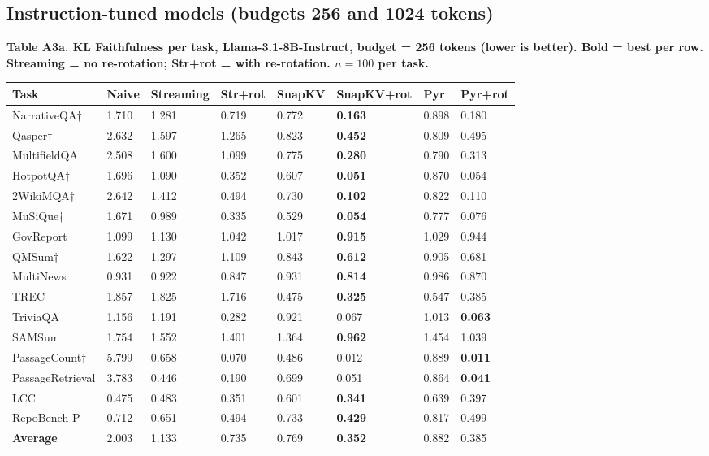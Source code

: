 \documentclass[10pt,letterpaper]{article}
\begin{document}
\subsection*{Instruction-tuned models (budgets 256 and 1024 tokens)}


\textbf{Table A3a. KL Faithfulness per task, Llama-3.1-8B-Instruct,
budget = 256 tokens (lower is better). Bold = best per row.
Streaming = no re-rotation; Str+rot = with re-rotation.
$n = 100$ per task.}

\begin{table}[H]
\centering
\small
\begin{tabular}{@{}llllllll@{}}
\toprule
Task & Naive & Streaming & Str+rot & SnapKV & SnapKV+rot & Pyr &
Pyr+rot\\
\midrule
NarrativeQA† & 1.710 & 1.281 & 0.719 & 0.772 & \textbf{0.163} & 0.898 &
0.180\\
Qasper† & 2.632 & 1.597 & 1.265 & 0.823 & \textbf{0.452} & 0.809 &
0.495\\
MultifieldQA & 2.508 & 1.600 & 1.099 & 0.775 & \textbf{0.280} & 0.790 &
0.313\\
HotpotQA† & 1.696 & 1.090 & 0.352 & 0.607 & \textbf{0.051} & 0.870 &
0.054\\
2WikiMQA† & 2.642 & 1.412 & 0.494 & 0.730 & \textbf{0.102} & 0.822 &
0.110\\
MuSiQue† & 1.671 & 0.989 & 0.335 & 0.529 & \textbf{0.054} & 0.777 &
0.076\\
GovReport & 1.099 & 1.130 & 1.042 & 1.017 & \textbf{0.915} & 1.029 &
0.944\\
QMSum† & 1.622 & 1.297 & 1.109 & 0.843 & \textbf{0.612} & 0.905 &
0.681\\
MultiNews & 0.931 & 0.922 & 0.847 & 0.931 & \textbf{0.814} & 0.986 &
0.870\\
TREC & 1.857 & 1.825 & 1.716 & 0.475 & \textbf{0.325} & 0.547 &
0.385\\
TriviaQA & 1.156 & 1.191 & 0.282 & 0.921 & 0.067 & 1.013 &
\textbf{0.063}\\
SAMSum & 1.754 & 1.552 & 1.401 & 1.364 & \textbf{0.962} & 1.454 &
1.039\\
PassageCount† & 5.799 & 0.658 & 0.070 & 0.486 & 0.012 & 0.889 &
\textbf{0.011}\\
PassageRetrieval & 3.783 & 0.446 & 0.190 & 0.699 & 0.051 & 0.864 &
\textbf{0.041}\\
LCC & 0.475 & 0.483 & 0.351 & 0.601 & \textbf{0.341} & 0.639 &
0.397\\
RepoBench-P & 0.712 & 0.651 & 0.494 & 0.733 & \textbf{0.429} & 0.817 &
0.499\\
\textbf{Average} & 2.003 & 1.133 & 0.735 & 0.769 & \textbf{0.352} & 0.882 &
0.385\\
\bottomrule
\end{tabular}
\end{table}
\end{document}
